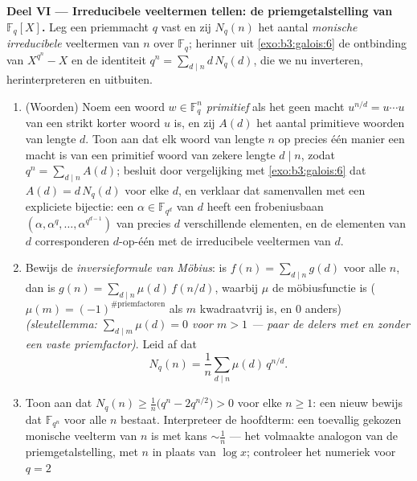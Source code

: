 \begin{problem}
\medskip
\noindent\textbf{Deel VI --- Irreducibele veeltermen tellen: de
priemgetalstelling van $\mathbb F_q[X]$.} Leg een priemmacht $q$
vast en zij $N_q(n)$ het aantal \emph{monische irreducibele}
veeltermen van  $n$ over $\mathbb F_q$; herinner uit
\cref{exo:b3:galois:6} de ontbinding van $X^{q^n} - X$ en de
identiteit $q^n = \sum_{d\mid n}d\,N_q(d)$, die we nu inverteren,
herinterpreteren en uitbuiten.
\begin{enumerate}[resume]
  \item (Woorden) Noem een woord $w \in \mathbb F_q^n$
        \emph{primitief} als het geen macht $u^{n/d} = u\cdots u$
        van een strikt korter woord $u$ is, en zij $A(d)$ het
        aantal primitieve woorden van lengte $d$. Toon aan dat elk
        woord van lengte $n$ op precies één manier een macht is
        van een primitief woord van zekere lengte $d \mid n$,
        zodat $q^n = \sum_{d \mid n}A(d)$; besluit door
        vergelijking met \cref{exo:b3:galois:6} dat $A(d) =
        d\,N_q(d)$ voor elke $d$, en verklaar dat samenvallen met
        een expliciete bijectie: een $\alpha \in \mathbb F_{q^d}$
        van  $d$ heeft een frobeniusbaan $(\alpha, \alpha^q,
        \dots, \alpha^{q^{d-1}})$ van precies $d$ verschillende
        elementen, en de elementen van  $d$ corresponderen
        $d$-op-één met de irreducibele veeltermen van  $d$.
  \item Bewijs de \emph{inversieformule van Möbius}: is $f(n) =
        \sum_{d\mid n}g(d)$ voor alle $n$, dan is $g(n) =
        \sum_{d\mid n}\mu(d)\,f(n/d)$, waarbij $\mu$ de
        möbiusfunctie is ($\mu(m) = (-1)^{\#\text{priemfactoren}}$
        als $m$ kwadraatvrij is, en $0$ anders) \emph{(sleutellemma:
        $\sum_{d \mid m}\mu(d) = 0$ voor $m > 1$ --- paar de
        delers met en zonder een vaste priemfactor)}. Leid af dat
        \[
        N_q(n) = \frac1n\sum_{d \mid n}\mu(d)\,q^{n/d} .
        \]
  \item Toon aan dat $N_q(n) \geq \frac1n\bigl(q^n -
        2q^{n/2}\bigr) > 0$ voor elke $n \geq 1$: een nieuw bewijs
        dat $\mathbb F_{q^n}$ voor alle $n$ bestaat. Interpreteer
        de hoofdterm: een toevallig gekozen monische veelterm van
         $n$ is  met kans $\sim \frac1n$ --- het
        volmaakte analogon van de priemgetalstelling, met $n$ in
        plaats van $\log x$; controleer het numeriek voor $q = 2$

\end{enumerate}
\end{problem}
